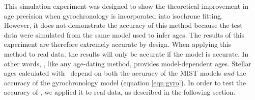 
This simulation experiment was designed to show the theoretical improvement in
age precision when gyrochronology is incorporated into isochrone fitting.
However, it does not demonstrate the accuracy of this method because the test
data were simulated from the same model used to infer ages.
The results of this experiment are therefore extremely accurate by design.
When applying this method to real data, the results will only be accurate if
the model is accurate.
In other words, \sd, like any age-dating method, provides model-dependent
ages.
Stellar ages calculated with \sd\ depend on both the accuracy of the MIST
models {\it and} the accuracy of the gyrochronology model (equation
\ref{eqn:gyro}).
In order to test the accuracy of \sd, we applied it to real data, as described
in the following section.

